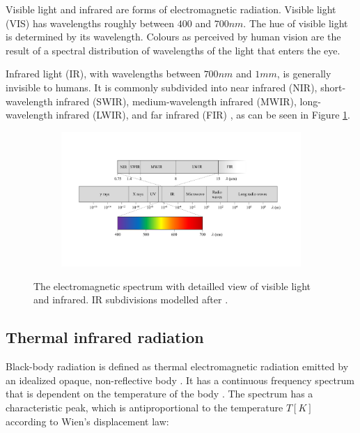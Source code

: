 \documentclass{l4proj}
\begin{document}
Visible light and infrared are forms of electromagnetic radiation. Visible light (VIS) has wavelengths roughly between $400$ and $700 nm$. The hue of visible light is determined by its wavelength. Colours as perceived by human vision are the result of a spectral distribution of wavelengths of the light that enters the eye. 

Infrared light (IR), with wavelengths between $700 nm$ and $1 mm$, is generally invisible to humans. It is commonly subdivided into near infrared (NIR), short-wavelength infrared (SWIR), medium-wavelength infrared (MWIR), long-wavelength infrared (LWIR), and far infrared (FIR) \citep[p. 28]{byrnes_unexploded_2008}, as can be seen in Figure \ref{fig:em_spectrum}.

\begin{figure}[ht]
  \centering
  \begin{subfigure}[h!]{0.8\textwidth}
    \includegraphics[width=\textwidth, trim={1.5cm 4cm 2cm 4cm}, clip=true]{images/EM_spectrum.pdf}
  \end{subfigure}
  \caption{The electromagnetic spectrum with detailled view of visible light and infrared. IR subdivisions modelled after \citet[p. 28]{byrnes_unexploded_2008}.}
  \label{fig:em_spectrum}
\end{figure}

\subsection{Thermal infrared radiation}

Black-body radiation is defined as thermal electromagnetic radiation emitted by an idealized opaque, non-reflective body \citep{young_sears_2012}. It has a continuous frequency spectrum that is dependent on the temperature of the body \citep{kogure_thermodynamic_2007}. The spectrum has a characteristic peak, which is antiproportional to the temperature $T [K]$ according to Wien's displacement law:
\end{document}
